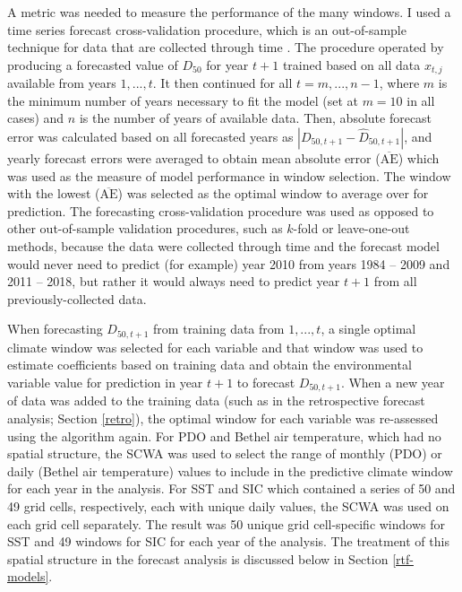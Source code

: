 \documentclass[12pt,]{book}
\theoremstyle{definition}
\theoremstyle{definition}
\theoremstyle{definition}
\theoremstyle{remark}
\begin{document}
A metric was needed to measure the performance of the many windows. I
used a time series forecast cross-validation procedure, which is an
out-of-sample technique for data that are collected through time
\citep{arlot-celisse-2010}. The procedure operated by producing a
forecasted value of \(D_{50}\) for year \(t+1\) trained based on all
data \(x_{t,j}\) available from years \(1, ..., t\). It then continued
for all \(t = m, ..., n-1\), where \(m\) is the minimum number of years
necessary to fit the model (set at \(m = 10\) in all cases) and \(n\) is
the number of years of available data. Then, absolute forecast error was
calculated based on all forecasted years as
\(|D_{50,t+1} - \hat{D}_{50,t+1}|\), and yearly forecast errors were
averaged to obtain mean absolute error (\(\overline{\text{AE}}\)) which
was used as the measure of model performance in window selection. The
window with the lowest (\(\overline{\text{AE}}\)) was selected as the
optimal window to average over for prediction. The forecasting
cross-validation procedure was used as opposed to other out-of-sample
validation procedures, such as \(k\)-fold or leave-one-out methods,
because the data were collected through time and the forecast model
would never need to predict (for example) year 2010 from years 1984 --
2009 and 2011 -- 2018, but rather it would always need to predict year
\(t+1\) from all previously-collected data.

When forecasting \(D_{50,t+1}\) from training data from \(1,...,t\), a
single optimal climate window was selected for each variable and that
window was used to estimate coefficients based on training data and
obtain the environmental variable value for prediction in year \(t+1\)
to forecast \(D_{50,t+1}\). When a new year of data was added to the
training data (such as in the retrospective forecast analysis; Section
\ref{retro}), the optimal window for each variable was re-assessed using
the algorithm again. For PDO and Bethel air temperature, which had no
spatial structure, the SCWA was used to select the range of monthly
(PDO) or daily (Bethel air temperature) values to include in the
predictive climate window for each year in the analysis. For SST and SIC
which contained a series of 50 and 49 grid cells, respectively, each
with unique daily values, the SCWA was used on each grid cell
separately. The result was 50 unique grid cell-specific windows for SST
and 49 windows for SIC for each year of the analysis. The treatment of
this spatial structure in the forecast analysis is discussed below in
Section \ref{rtf-models}.
\end{document}
